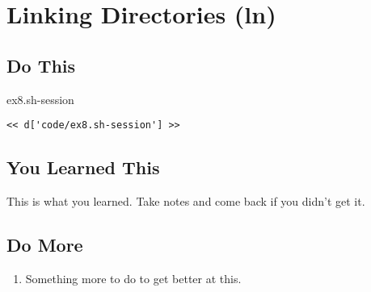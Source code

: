 \chapter{Linking Directories (ln)}

\section{Do This}

\begin{code}{ex8.sh-session}
\begin{Verbatim}
<< d['code/ex8.sh-session'] >>
\end{Verbatim}
\end{code}


\section{You Learned This}

This is what you learned.  Take notes and come back if you didn't get it.

\section{Do More}

\begin{enumerate}
\item Something more to do to get better at this.
\end{enumerate}

